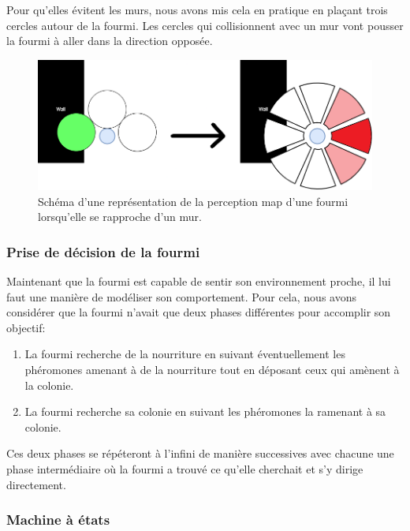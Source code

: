 \documentclass{EPUProjetDi}
\begin{document}
Pour qu'elles évitent les murs, nous avons mis cela en pratique en plaçant trois cercles autour de la fourmi. 
Les cercles qui collisionnent avec un mur vont pousser la fourmi à aller dans la direction opposée.

\begin{figure}[h]
    \centering
    \includegraphics[scale=0.5]{wall_avoidance.png}
    \caption{Schéma d'une représentation de la perception map d'une fourmi lorsqu'elle se rapproche d'un mur.}
    \label{fig:wall_avoidance}
\end{figure}

\subsubsection{Prise de décision de la fourmi}

Maintenant que la fourmi est capable de sentir son environnement proche, il lui faut une manière de modéliser son comportement.
Pour cela, nous avons considérer que la fourmi n'avait que deux phases différentes pour accomplir son objectif:
\begin{enumerate}
    \item La fourmi recherche de la nourriture en suivant éventuellement les phéromones amenant à de la nourriture tout en déposant ceux qui amènent à la colonie.
    \item La fourmi recherche sa colonie en suivant les phéromones la ramenant à sa colonie.
\end{enumerate}

Ces deux phases se répéteront à l'infini de manière successives avec chacune une phase intermédiaire où la fourmi a trouvé ce qu'elle cherchait
et s'y dirige directement. 

\pagebreak

\subsubsection{Machine à états}
\end{document}
